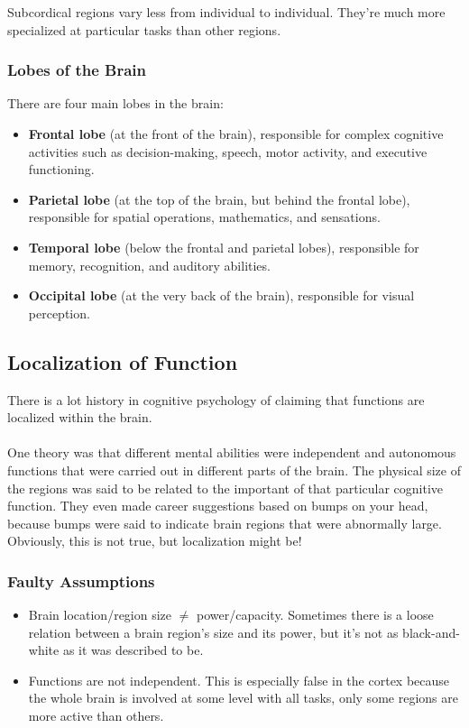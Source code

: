 \documentclass[]{article}
\begin{document}
				Subcordical regions vary less from individual to individual. They're much more specialized at particular tasks than other regions.
			\subsubsection{Lobes of the Brain}
				There are four main lobes in the brain:
				\begin{itemize}
					\item \textbf{Frontal lobe} (at the front of the brain), responsible for complex cognitive activities such as decision-making, speech, motor activity, and executive functioning.
					\item \textbf{Parietal lobe} (at the top of the brain, but behind the frontal lobe), responsible for spatial operations, mathematics, and sensations.
					\item \textbf{Temporal lobe} (below the frontal and parietal lobes), responsible for memory, recognition, and auditory abilities.
					\item \textbf{Occipital lobe} (at the very back of the brain), responsible for visual perception.
				\end{itemize}
		\subsection{Localization of Function}
			There is a lot history in cognitive psychology of claiming that functions are localized within the brain.
			\\ \\
			One theory was that different mental abilities were independent and autonomous functions that were carried out in different parts of the brain. The physical size of the regions was said to be related to the important of that particular cognitive function. They even made career suggestions based on bumps on your head, because bumps were said to indicate brain regions that were abnormally large. Obviously, this is not true, but localization might be!
			\subsubsection{Faulty Assumptions}
				\begin{itemize}
					\item Brain location/region size $\ne$ power/capacity. Sometimes there is a loose relation between a brain region's size and its power, but it's not as black-and-white as it was described to be.
					\item Functions are not independent. This is especially false in the cortex because the whole brain is involved at some level with all tasks, only some regions are more active than others.
				\end{itemize}
\end{document}
